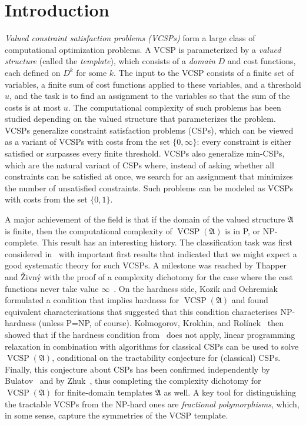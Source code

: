 \documentclass[preprint,12pt]{elsarticle}
\newcommand{\bA}{{\mathfrak A}}
\DeclareMathOperator{\vcsp}{VCSP}
\begin{document}
\section{Introduction}
\emph{Valued constraint satisfaction problems (VCSPs)} form
a large class of computational optimization problems.
A VCSP is parameterized by a \emph{valued structure} (called the \emph{template}), which consists of a \emph{domain} $D$ and cost functions, each defined on $D^k$ for some $k$. The input to the VCSP consists of a finite set of variables, a finite sum of cost functions applied to these variables,  and a threshold $u$, 
and the task is to find an assignment to the variables so that the sum of the costs is at most $u$. The computational complexity of such problems has been studied depending on
the valued structure that parameterizes the problem. 
VCSPs generalize constraint satisfaction problems (CSPs), which can be viewed as a variant of VCSPs with costs from the set $\{0, \infty\}$: every constraint is either satisfied or surpasses every finite threshold. 
VCSPs also generalize min-CSPs, 
which are the natural variant of CSPs
where, instead of asking whether all constraints can be satisfied at once, we search for an assignment that minimizes the number of unsatisfied constraints. Such problems can be modeled as VCSPs with costs from the set $\{0,1\}$.

A major achievement of the field is that if the domain
of the valued structure $\bA$ is finite, then the computational complexity of $\vcsp(\bA)$ is in P, or NP-complete. This result has an interesting history.
The classification task was first considered in~\cite{CohenCooperJeavonsVCSP} with important first results that indicated that we might expect a good systematic theory for such VCSPs. A milestone was reached by Thapper and \v{Z}ivn\'{y} with the proof of a complexity dichotomy for the case where the cost functions never take value $\infty$~\cite{ThapperZivny13}.
On the hardness side, 
Kozik and Ochremiak~\cite{KozikOchremiak15} formulated a condition that implies hardness for $\vcsp(\bA)$ and found equivalent characterisations that suggested that this condition characterises NP-hardness (unless P=NP, of course). Kolmogorov, Krokhin, and Rol\'{i}nek~\cite{KolmogorovKR17} then showed that if the hardness condition from~\cite{KozikOchremiak15} does not apply, linear programming relaxation in combination with algorithms for classical CSPs can be used to solve $\vcsp(\bA)$, conditional on the tractability conjecture for (classical) CSPs. Finally, this conjecture about CSPs has been confirmed
independently by Bulatov~\cite{BulatovFVConjecture} and by Zhuk~\cite{ZhukFVConjecture, Zhuk20}, thus completing the complexity dichotomy for $\vcsp(\bA)$ for finite-domain templates $\bA$ as well.
A key tool for distinguishing the tractable VCSPs from the NP-hard ones are \emph{fractional polymorphisms}, which, in some sense, capture the symmetries of the VCSP template. 
\end{document}
